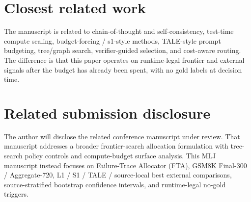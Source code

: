 \documentclass[11pt]{article}
\begin{document}
\section*{Closest related work}
The manuscript is related to chain-of-thought and self-consistency, test-time compute scaling, budget-forcing / s1-style methods, TALE-style prompt budgeting, tree/graph search, verifier-guided selection, and cost-aware routing. The difference is that this paper operates on runtime-legal frontier and external signals after the budget has already been spent, with no gold labels at decision time.

\section*{Related submission disclosure}
The author will disclose the related conference manuscript under review. That manuscript addresses a broader frontier-search allocation formulation with tree-search policy controls and compute-budget surface analysis. This MLJ manuscript instead focuses on Failure-Trace Allocator (FTA), GSM8K Final-300 / Aggregate-720, L1 / S1 / TALE / source-local best external comparisons, source-stratified bootstrap confidence intervals, and runtime-legal no-gold triggers.
\end{document}
